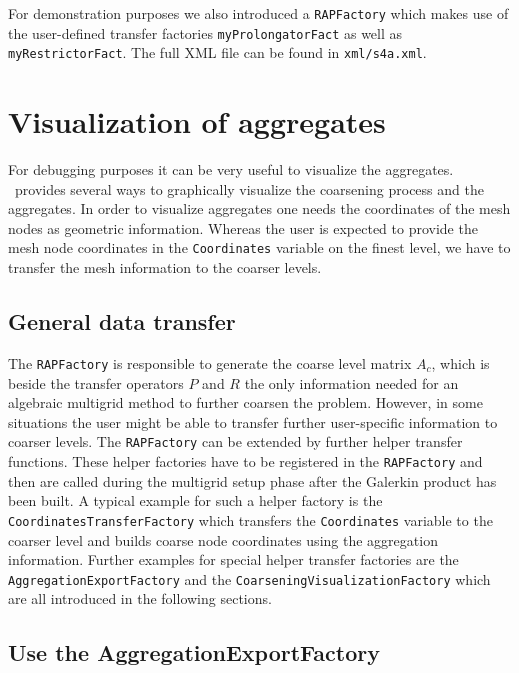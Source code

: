 \documentclass[10pt,fleqn]{book}
\begin{document}
For demonstration purposes we also introduced a \verb|RAPFactory| which makes use of the user-defined transfer factories \verb|myProlongatorFact| as well as \verb|myRestrictorFact|. The full XML file can be found in \verb|xml/s4a.xml|.\\



\section{Visualization of aggregates}

For debugging purposes it can be very useful to visualize the aggregates. \muelu~provides several ways to graphically visualize the coarsening process and the aggregates. In order to visualize aggregates one needs the coordinates of the mesh nodes as geometric information. Whereas the user is expected to provide the mesh node coordinates in the \verb|Coordinates| variable on the finest level, we have to transfer the mesh information to the coarser levels.

\subsection{General data transfer}

The \verb|RAPFactory| is responsible to generate the coarse level matrix $A_c$, which is beside the transfer operators $P$ and $R$ the only information needed for an algebraic multigrid method to further coarsen the problem. However, in some situations the user might be able to transfer further user-specific information to coarser levels. The \verb|RAPFactory| can be extended by further helper transfer functions. These helper factories have to be registered in the \verb|RAPFactory| and then are called during the multigrid setup phase after the Galerkin product has been built. A typical example for such a helper factory is the \verb|CoordinatesTransferFactory| which transfers the \verb|Coordinates| variable to the coarser level and builds coarse node coordinates using the aggregation information. Further examples for special helper transfer factories are the \verb|AggregationExportFactory| and the \verb|CoarseningVisualizationFactory| which are all introduced in the following sections.

\subsection{Use the AggregationExportFactory}
\end{document}
